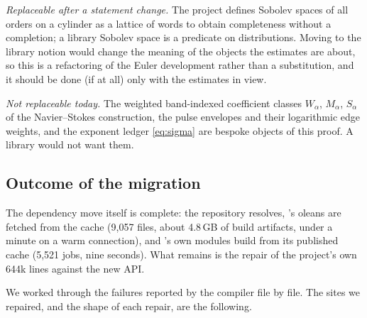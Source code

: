 \emph{Replaceable after a statement change.} The project defines Sobolev spaces of all
orders on a cylinder as a lattice of words to obtain completeness without a completion; a
library Sobolev space is a predicate on distributions. Moving to the library notion would
change the meaning of the objects the estimates are about, so this is a refactoring of the
Euler development rather than a substitution, and it should be done (if at all) only with the
estimates in view.

\emph{Not replaceable today.} The weighted band-indexed coefficient classes $W_\alpha$,
$M_\alpha$, $S_\alpha$ of the Navier--Stokes construction, the pulse envelopes and their
logarithmic edge weights, and the exponent ledger \eqref{eq:sigma} are bespoke objects of
this proof. A library would not want them.

\subsection{Outcome of the migration}
\label{sec:migration-results}

The dependency move itself is complete: the repository resolves, \Mathlib{}'s oleans are
fetched from the cache (9{,}057 files, about 4.8\,GB of build artifacts, under a minute on
a warm connection), and \TauCeti{}'s own modules build from its published cache (5{,}521
jobs, nine seconds). What remains is the repair of the project's own 644k lines against the
new API.

We worked through the failures reported by the compiler file by file. The sites we
repaired, and the shape of each repair, are the following.

